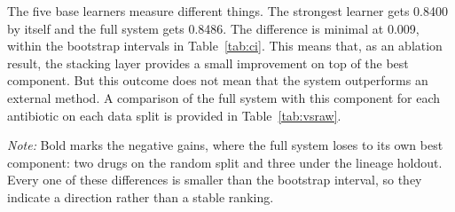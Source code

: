 The five base learners measure different things. The strongest learner gets 0.8400
by itself and the full system gets 0.8486. The difference is minimal at 0.009,
within the bootstrap intervals in Table~\ref{tab:ci}. This means that, as an
ablation result, the stacking layer provides a small improvement on top of the
best component. But this outcome does not mean that the system outperforms an
external method. A comparison of the full system with this component for each
antibiotic on each data split is provided in Table~\ref{tab:vsraw}.

\begin{table}[htb]
\centering
\caption{Comparison of the proposed model with its best single component, the
chi-squared filtered XGBoost, for each antibiotic. The antibiotics are sorted by
the gain on the random split.}
\label{tab:vsraw}
\small
{}
\vspace{0.4em}

\noindent\footnotesize\textit{Note:} Bold marks the negative gains, where the full system loses
to its own best component: two drugs on the random split and three under the lineage holdout.
Every one of these differences is smaller than the bootstrap interval, so they indicate a
direction rather than a stable ranking.
\end{table}

